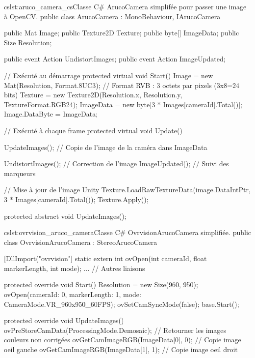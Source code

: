 \begin{listingETS}{cs}{lst:aruco_camera_cs}{Classe C\# ArucoCamera simplifée pour passer une image à OpenCV.}
  public class ArucoCamera : MonoBehaviour, IArucoCamera
  {
    public Mat Image;
    public Texture2D Texture;
    public byte[] ImageData;
    public Size Resolution;

    public event Action UndistortImages;
    public event Action ImageUpdated;

    // Exécuté au démarrage
    protected virtual void Start()
    {
      Image = new Mat(Resolution, Format.8UC3); // Format RVB : 3 octets par pixels (3x8=24 bits)
      Texture = new Texture2D(Resolution.x, Resolution.y, TextureFormat.RGB24);
      ImageData = new byte[3 * Images[cameraId].Total()];
      Image.DataByte = ImageData;
    }

    // Exécuté à chaque frame
    protected virtual void Update()
    {
      UpdateImages(); // Copie de l'image de la caméra dans ImageData

      UndistortImages(); // Correction de l'image
      ImageUpdated(); // Suivi des marqueurs

      // Mise à jour de l'image Unity
      Texture.LoadRawTextureData(image.DataIntPtr, 3 * Images[cameraId].Total());
      Texture.Apply();
    }

    protected abstract void UpdateImages();
  }
\end{listingETS}

\begin{listingETS}{cs}{lst:ovrvision_aruco_camera}{Classe C\# OvrvisionArucoCamera simplifiée.}
  public class OvrvisionArucoCamera : StereoArucoCamera
  {
    [DllImport("ovrvision"]
    static extern int ovOpen(int cameraId, float markerLength, int mode);
    ... // Autres liaisons

    protected override void Start()
    {
      Resolution = new Size(960, 950);
      ovOpen(cameraId: 0, markerLength: 1, mode: CameraMode.VR_960x950_60FPS);
      ovSetCamSyncMode(false);
      base.Start();
    }

    protected override void UpdateImages()
    {
      ovPreStoreCamData(ProcessingMode.Demosaic); // Retourner les images couleurs non corrigées
      ovGetCamImageRGB(ImageData[0], 0); // Copie image oeil gauche
      ovGetCamImageRGB(ImageData[1], 1); // Copie image oeil droit
    }
  }
\end{listingETS}

